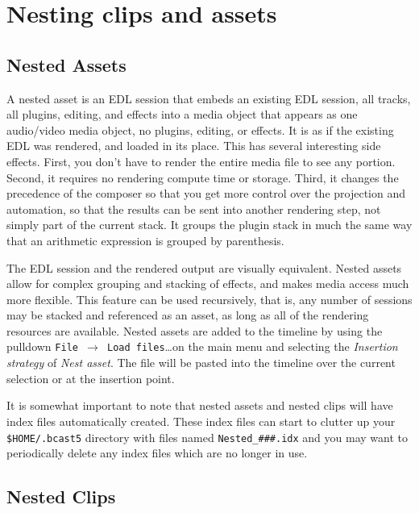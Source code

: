 \section{Nesting clips and assets}%
\label{sec:nesting_clips_and_assets}

\subsection{Nested Assets}%
\label{sub:nested_assets}

A nested asset is an EDL session that
embeds an existing EDL session, all tracks, all plugins, editing,
and effects into a media object that appears as one audio/video
media object, no plugins, editing, or effects.  It is as if the
existing EDL was rendered, and loaded in its place.  This has
several interesting side effects.  First, you don’t have to render
the entire media file to see any portion.  Second, it requires no
rendering compute time or storage.  Third, it changes the precedence
of the composer so that you get more control over the projection and
automation, so that the results can be sent into another rendering
step, not simply part of the current stack.  It groups the plugin
stack in much the same way that an arithmetic expression is grouped
by parenthesis.

The EDL session and the rendered output are visually equivalent.
Nested assets allow for complex grouping and stacking of effects,
and makes media access much more flexible.  This feature can be used
recursively, that is, any number of sessions may be stacked and
referenced as an asset, as long as all of the rendering resources
are available.  Nested assets are added to the timeline by using the
pulldown \texttt{File $\rightarrow$ Load files}\dots on the main
menu and selecting the \textit{Insertion strategy} of \textit{Nest
	asset}. The file will be pasted into the timeline over the current
selection or at the insertion point.

It is somewhat important to note that nested assets and nested clips
will have index files automatically created.  These index files can
start to clutter up your \texttt{\$HOME/.bcast5} directory with
files named \texttt{Nested\_\#\#\#.idx} and you may want to
periodically delete any index files which are no longer in use.

\subsection{Nested Clips}%
\label{sub:nested_clips}

